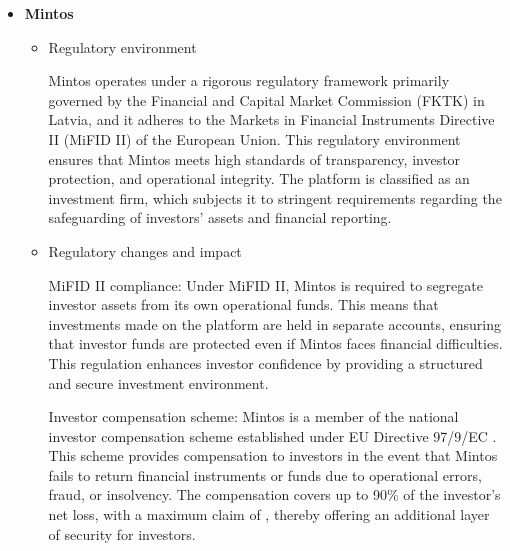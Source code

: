 \documentclass{article}
\begin{document}
\begin{itemize}
\begin{itemize}
        International regulatory compliance: As a company listed on the New York Stock Exchange (NYSE), Yiren Digital also complies with the regulations of the U.S. Securities and Exchange Commission (SEC). This includes rigorous reporting requirements and adherence to international standards of financial transparency and corporate governance.
        
        Regulatory impact on operations: The evolving regulatory landscape has prompted Yiren Digital to enhance its compliance infrastructure and diversify its product offerings. The company has implemented advanced risk management systems and increased transparency in its operations to meet regulatory expectations both in China and internationally. These changes have helped stabilize the company's operations and align with regulatory standards.

    \end{itemize}

    \item \textbf{Mintos}
    \begin{itemize}
        \item Regulatory environment

        Mintos operates under a rigorous regulatory framework primarily governed by the Financial and Capital Market Commission (FKTK) in Latvia, and it adheres to the Markets in Financial Instruments Directive II (MiFID II) of the European Union. This regulatory environment ensures that Mintos meets high standards of transparency, investor protection, and operational integrity. The platform is classified as an investment firm, which subjects it to stringent requirements regarding the safeguarding of investors' assets and financial reporting.

        \item Regulatory changes and impact

        MiFID II compliance: Under MiFID II, Mintos is required to segregate investor assets from its own operational funds. This means that investments made on the platform are held in separate accounts, ensuring that investor funds are protected even if Mintos faces financial difficulties. This regulation enhances investor confidence by providing a structured and secure investment environment.
        
        Investor compensation scheme: Mintos is a member of the national investor compensation scheme established under EU Directive 97/9/EC \citep{official_journal_l_084_directive_1997}. This scheme provides compensation to investors in the event that Mintos fails to return financial instruments or funds due to operational errors, fraud, or insolvency. The compensation covers up to 90\% of the investor's net loss, with a maximum claim of , thereby offering an additional layer of security for investors.
        

\end{itemize}
\end{itemize}
\end{document}
